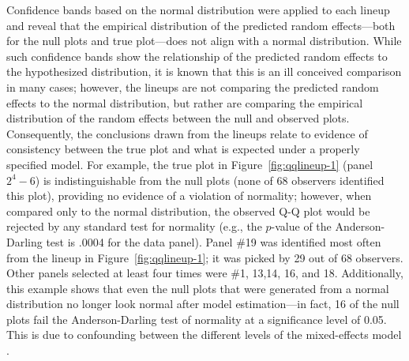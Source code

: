 \documentclass[12pt]{article} %
\newcommand{\hh}[1]{{\color{orange} #1}}
\newcommand{\al}[1]{{\color{ForestGreen} #1}}
\begin{document}
Confidence bands based on the normal distribution were applied to each lineup and reveal that the empirical distribution of the predicted random effects---both for the null plots and true plot---does not align with a normal distribution. While such confidence bands show the relationship of the predicted random effects to the hypothesized distribution, it is known that this is an ill conceived comparison in many cases; however, the lineups are not comparing the predicted random effects to the normal distribution, but rather are comparing the empirical distribution of the random effects between the null and observed plots. Consequently, the conclusions drawn from the lineups relate to evidence of consistency between the true plot and what is expected under a properly specified model. For example, the true plot in Figure~\ref{fig:qqlineup-1} (panel $2^4 - 6$) is indistinguishable from the null plots (none of 68 observers identified this plot), providing no evidence of a violation of normality; however, when compared only to the normal distribution, the observed Q-Q plot would %
be rejected by any standard test for normality (e.g., the $p$-value of the Anderson-Darling test is .0004 for the data panel).
Panel \#19 was identified  most often from the lineup in Figure~\ref{fig:qqlineup-1}; it was picked by \hh{29 out of 68 observers. Other panels  selected at least four times were \#1, 13,14, 16, and 18. }
Additionally, this example shows that even the null plots that were generated from a normal distribution no longer look normal after  model estimation---in fact, 16 of the null plots fail the Anderson-Darling test of normality at a significance level of 0.05. \hh{This is due to confounding between the different levels of the mixed-effects model  \citep{adam}.} 
\end{document}
